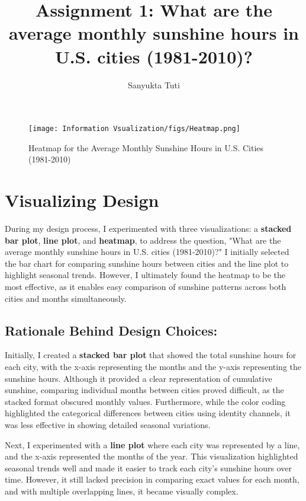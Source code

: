 \documentclass{article}
\title{Assignment 1: What are the average monthly sunshine hours in U.S. cities (1981-2010)?}
\author{Sanyukta Tuti}
\begin{document}
  \maketitle %
  \thispagestyle{empty}

\begin{figure}[ht] %
    \centering
    \texttt{[image: Information Vsualization/figs/Heatmap.png]}
    \caption{
        Heatmap for the Average Monthly Sunshine Hours in U.S. Cities (1981-2010)
    }
    \label{fig:fig1}
\end{figure}

\section{Visualizing Design}
\label{sec:sec1}

During my design process, I experimented with three visualizations: a \textbf{stacked bar plot}, \textbf{line plot}, and \textbf{heatmap}, to address the question, "What are the average monthly sunshine hours in U.S. cities (1981-2010)?" I initially selected the bar chart for comparing sunshine hours between cities and the line plot to highlight seasonal trends. However, I ultimately found the heatmap to be the most effective, as it enables easy comparison of sunshine patterns across both cities and months simultaneously.

\subsection{Rationale Behind Design Choices:}
                
Initially, I created a \textbf{stacked bar plot} that showed the total sunshine hours for each city, with the x-axis representing the months and the y-axis representing the sunshine hours. Although it provided a clear representation of cumulative sunshine, comparing individual months between cities proved difficult, as the stacked format obscured monthly values. Furthermore, while the color coding highlighted the categorical differences between cities using identity channels, it was less effective in showing detailed seasonal variations.\cite{munzner2014visualization}

Next, I experimented with a \textbf{line plot} where each city was represented by a line, and the x-axis represented the months of the year. This visualization highlighted seasonal trends well and made it easier to track each city’s sunshine hours over time. However, it still lacked precision in comparing exact values for each month, and with multiple overlapping lines, it became visually complex.
\end{document}
